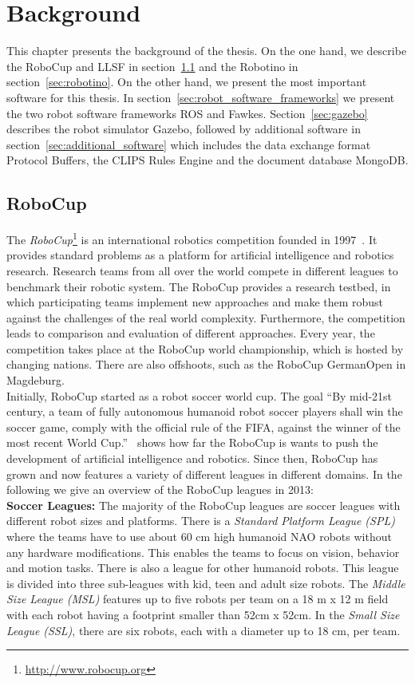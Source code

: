 \chapter{Background}
\label{cha:background}
This chapter presents the background of the thesis. On the one hand, we describe the RoboCup and LLSF in section~\ref{sec:robocup} and the Robotino in section~\ref{sec:robotino}. On the other hand, we present the most important software for this thesis. In section~\ref{sec:robot_software_frameworks} we present the two robot software frameworks ROS and Fawkes. Section~\ref{sec:gazebo} describes the robot simulator Gazebo, followed by additional software in section~\ref{sec:additional_software} which includes the data exchange format Protocol Buffers, the CLIPS Rules Engine and the document database MongoDB.

\section{RoboCup}
\label{sec:robocup}
The \textit{RoboCup}\footnote{\url{http://www.robocup.org}} is an international robotics competition founded in 1997~\cite{Robocup}. It provides standard problems as a platform for artificial intelligence and robotics research. Research teams from all over the world compete in different leagues to benchmark their robotic system. The RoboCup provides a research testbed, in which participating teams implement new approaches and make them robust against the challenges of the real world complexity. Furthermore, the competition leads to comparison and evaluation of different approaches. Every year, the competition takes place at the RoboCup world championship, which is hosted by changing nations. There are also offshoots, such as the RoboCup GermanOpen in Magdeburg.\\
Initially, RoboCup started as a robot soccer world cup. The goal ``By mid-21st century, a team of fully autonomous humanoid robot soccer players shall win the soccer game, comply with the official rule of the FIFA, against the winner of the most recent World Cup.''~\cite{robocup_goal} shows how far the RoboCup is wants to push the development of artificial intelligence and robotics. Since then, RoboCup has grown and now features a variety of different leagues in different domains. In the following we give an overview of the RoboCup leagues in 2013:\\
\textbf{Soccer Leagues:} The majority of the RoboCup leagues are soccer leagues with different robot sizes and platforms. There is a \textit{Standard Platform League (SPL)} where the teams have to use about 60 cm high humanoid NAO robots without any hardware modifications. This enables the teams to focus on vision, behavior and motion tasks. There is also a league for other humanoid robots. This league is divided into three sub-leagues with kid, teen and adult size robots. The \textit{Middle Size League (MSL)} features up to five robots per team on a 18 m x 12 m field with each robot having a footprint smaller than 52cm x 52cm. In the \textit{Small Size League (SSL)}, there are six robots, each with a diameter up to 18 cm, per team.\\
